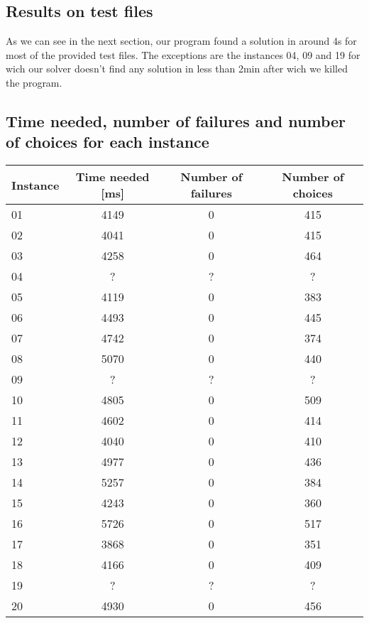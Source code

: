 \documentclass{eplDoc}
\begin{document}
\subsection{Results on test files}

As we can see in the next section, our program found a solution in around 4s for most of the provided test files. The exceptions are the instances 04, 09 and 19 for wich our solver doesn't find any solution in less than 2min after wich we killed the program. \\ 


\subsection{Time needed, number of failures and number of choices for each instance}
\begin{center}
		\begin{tabular}{|l|c|c|c|}
			\hline
			Instance & Time needed [ms] & Number of failures & Number of choices \\ 
			\hline
			01 & 4149 & 0 & 415 \\ 
			02 & 4041 & 0 & 415 \\ 
			03 & 4258 & 0 & 464 \\ 
			04 & ? & ? & ? \\ 
			05 & 4119 & 0 & 383 \\ 
			06 & 4493 & 0 & 445 \\ 
			07 & 4742 & 0 & 374 \\ 
			08 & 5070 & 0 & 440 \\ 
			09 & ? & ? & ? \\ 
			10 & 4805 & 0 & 509 \\ 
			11 & 4602 & 0 & 414 \\ 
			12 & 4040 & 0 & 410 \\ 
			13 & 4977 & 0 & 436 \\ 
			14 & 5257 & 0 & 384 \\ 
			15 & 4243 & 0 & 360 \\ 
			16 & 5726 & 0 & 517 \\ 
			17 & 3868 & 0 & 351 \\ 
			18 & 4166 & 0 & 409 \\ 
			19 & ? & ? & ? \\ 
			20 & 4930 & 0 & 456 \\
			\hline
		\end{tabular}
\end{center}
\end{document}

